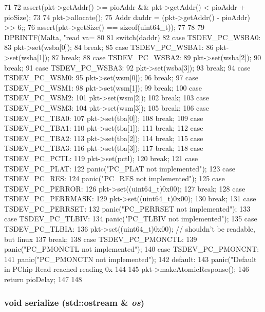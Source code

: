 \begin{DoxyCode}
71 {
72     assert(pkt->getAddr() >= pioAddr && pkt->getAddr() < pioAddr + pioSize);
73 
74     pkt->allocate();
75     Addr daddr = (pkt->getAddr() - pioAddr) >> 6;;
76     assert(pkt->getSize() == sizeof(uint64_t));
77 
78 
79     DPRINTF(Malta, "read  va=%
80 
81     switch(daddr) {
82       case TSDEV_PC_WSBA0:
83             pkt->set(wsba[0]);
84             break;
85       case TSDEV_PC_WSBA1:
86             pkt->set(wsba[1]);
87             break;
88       case TSDEV_PC_WSBA2:
89             pkt->set(wsba[2]);
90             break;
91       case TSDEV_PC_WSBA3:
92             pkt->set(wsba[3]);
93             break;
94       case TSDEV_PC_WSM0:
95             pkt->set(wsm[0]);
96             break;
97       case TSDEV_PC_WSM1:
98             pkt->set(wsm[1]);
99             break;
100       case TSDEV_PC_WSM2:
101             pkt->set(wsm[2]);
102             break;
103       case TSDEV_PC_WSM3:
104             pkt->set(wsm[3]);
105             break;
106       case TSDEV_PC_TBA0:
107             pkt->set(tba[0]);
108             break;
109       case TSDEV_PC_TBA1:
110             pkt->set(tba[1]);
111             break;
112       case TSDEV_PC_TBA2:
113             pkt->set(tba[2]);
114             break;
115       case TSDEV_PC_TBA3:
116             pkt->set(tba[3]);
117             break;
118       case TSDEV_PC_PCTL:
119             pkt->set(pctl);
120             break;
121       case TSDEV_PC_PLAT:
122             panic("PC_PLAT not implemented\n");
123       case TSDEV_PC_RES:
124             panic("PC_RES not implemented\n");
125       case TSDEV_PC_PERROR:
126             pkt->set((uint64_t)0x00);
127             break;
128       case TSDEV_PC_PERRMASK:
129             pkt->set((uint64_t)0x00);
130             break;
131       case TSDEV_PC_PERRSET:
132             panic("PC_PERRSET not implemented\n");
133       case TSDEV_PC_TLBIV:
134             panic("PC_TLBIV not implemented\n");
135       case TSDEV_PC_TLBIA:
136             pkt->set((uint64_t)0x00); // shouldn't be readable, but linux
137             break;
138       case TSDEV_PC_PMONCTL:
139             panic("PC_PMONCTL not implemented\n");
140       case TSDEV_PC_PMONCNT:
141             panic("PC_PMONCTN not implemented\n");
142       default:
143           panic("Default in PChip Read reached reading 0x%
144     }
145     pkt->makeAtomicResponse();
146     return pioDelay;
147 
148 }
\end{DoxyCode}
\hypertarget{classMaltaPChip_a53e036786d17361be4c7320d39c99b84}{
\subsubsection[{serialize}]{\setlength{\rightskip}{0pt plus 5cm}void serialize (std::ostream \& {\em os})}}
